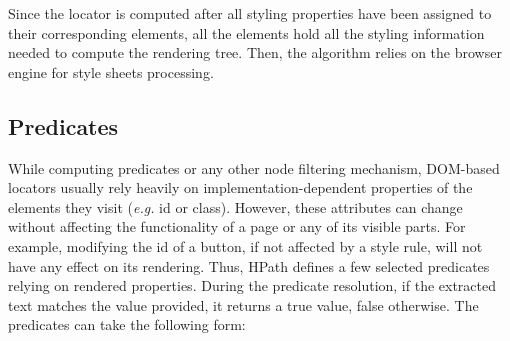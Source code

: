 Since the locator is computed after all styling properties have been assigned to their corresponding elements, all the elements hold all the styling information needed to compute the rendering tree. Then, the algorithm relies on the browser engine for style sheets processing. 

\subsection{Predicates}
\label{sec:hpath-hpath-predicates}

While computing predicates or any other node filtering mechanism, DOM-based locators usually rely heavily on implementation-dependent properties of the elements they visit (\emph{e.g.} id or class). However, these attributes can change without affecting the functionality of a page or any of its visible parts. For example, modifying the id of a button, if not affected by a style rule, will not have any effect on its rendering. Thus, HPath defines a few selected predicates relying on rendered properties. During the predicate resolution, if the extracted text matches the value provided, it returns a true value, false otherwise. The predicates can take the following form:

